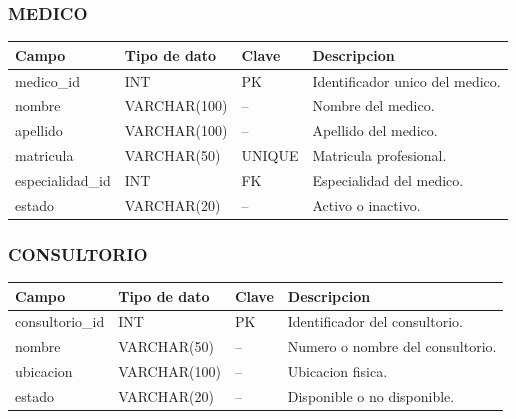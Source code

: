 \documentclass[11pt,letterpaper]{article}
\begin{document}
\subsubsection*{MEDICO}
\begin{center}
\small
\begin{tabularx}{\textwidth}{@{}p{3.2cm}p{3cm}p{2cm}Y@{}}
  \toprule
  \textbf{Campo} & \textbf{Tipo de dato} & \textbf{Clave} & \textbf{Descripcion} \\
  \midrule
  medico\_id & INT & PK & Identificador unico del medico. \\
  nombre & VARCHAR(100) & -- & Nombre del medico. \\
  apellido & VARCHAR(100) & -- & Apellido del medico. \\
  matricula & VARCHAR(50) & UNIQUE & Matricula profesional. \\
  especialidad\_id & INT & FK & Especialidad del medico. \\
  estado & VARCHAR(20) & -- & Activo o inactivo. \\
  \bottomrule
\end{tabularx}
\end{center}

\subsubsection*{CONSULTORIO}
\begin{center}
\small
\begin{tabularx}{\textwidth}{@{}p{3.2cm}p{3cm}p{2cm}Y@{}}
  \toprule
  \textbf{Campo} & \textbf{Tipo de dato} & \textbf{Clave} & \textbf{Descripcion} \\
  \midrule
  consultorio\_id & INT & PK & Identificador del consultorio. \\
  nombre & VARCHAR(50) & -- & Numero o nombre del consultorio. \\
  ubicacion & VARCHAR(100) & -- & Ubicacion fisica. \\
  estado & VARCHAR(20) & -- & Disponible o no disponible. \\
  \bottomrule
\end{tabularx}
\end{center}
\end{document}
